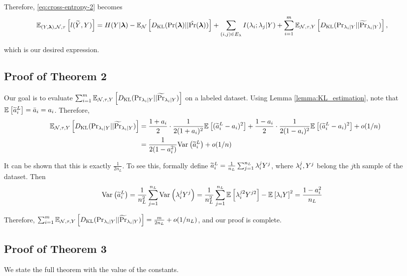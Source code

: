 Therefore, \eqref{eq:cross-entropy-2} becomes
\begin{align}
    \mathbb{E}_{(Y, \bm{\lambda}), \mathcal{N}, \tau}\left[l(\widetilde{Y}, Y)\right] &= H(Y | \bm{\lambda}) - \mathbb{E}_{\mathcal{N}}\left[D_{\mathrm{KL}} (\Pr(\bm{\lambda}) || \hat{\Pr}(\bm{\lambda}))\right] + \sum_{(i, j) \in E_{\lambda}} I(\lambda_i; \lambda_j | Y) + \sum_{i = 1}^m \mathbb{E}_{\mathcal{N}, \tau, Y}\left[D_{\mathrm{KL}} (\mathrm{Pr}_{\lambda_i | Y} || \widetilde{\Pr}_{\lambda_i | Y} )\right], \nonumber 
\end{align}

which is our desired expression.


\subsection{Proof of Theorem 2}

Our goal is to evaluate $\sum_{i = 1}^m \mathbb{E}_{\mathcal{N}, \tau, Y}\left[D_{\mathrm{KL}} (\mathrm{Pr}_{\lambda_i | Y} || \widetilde{\Pr}_{\lambda_i | Y} )\right]$ on a labeled dataset. Using Lemma \ref{lemma:KL_estimation}, note that $\mathbb{E}_{}\left[\widetilde{a}_i^L\right] = \bar{a}_i = a_i$. Therefore,
\begin{align*}
   \mathbb{E}_{\mathcal{N}, \tau, Y}\left[D_{\mathrm{KL}} (\mathrm{Pr}_{\lambda_i | Y} || \widetilde{\Pr}_{\lambda_i | Y} )\right] &= \frac{1 + a_i}{2} \cdot \frac{1}{2(1 + a_i)^2} \mathbb{E}_{}\left[(\widetilde{a}_i^L - a_i)^2\right] + \frac{1 - a_i}{2} \cdot \frac{1}{2(1 - a_i)^2} \mathbb{E}_{}\left[(\widetilde{a}_i^L - a_i)^2\right] + o(1/n) \\
   &=  \frac{1}{2(1 - a_i^2)} \mathrm{Var}_{}\left(\widetilde{a}_i^L\right) + o(1/n)
\end{align*}

It can be shown that this is exactly $\frac{1}{2n_L}$. To see this, formally define $\widetilde{a}_i^L = \frac{1}{n_L} \sum_{j = 1}^{n_L} \lambda_i^j Y^j$, where $\lambda_i^j, Y^j$ belong the $j$th sample of the dataset. Then
\begin{align}
    \mathrm{Var}_{}\left(\widetilde{a}_i^L\right) &= \frac{1}{n_L^2} \sum_{j = 1}^{n_L} \mathrm{Var}_{}\left(\lambda_i^j Y^j\right) = \frac{1}{n_L^2} \sum_{j = 1}^{n_L} \mathbb{E}_{}\left[\lambda_i^{j2} Y^{j2}\right] - \mathbb{E}_{}\left[\lambda_i Y\right]^2 = \frac{1 -a_i^2}{n_L}
\end{align}

Therefore, $\sum_{i = 1}^m \mathbb{E}_{\mathcal{N}, \tau, Y}\left[D_{\mathrm{KL}} (\mathrm{Pr}_{\lambda_i | Y} || \widetilde{\Pr}_{\lambda_i | Y} )\right] = \frac{m}{2n_L} + o(1/n_L)$, and our proof is complete.

\subsection{Proof of Theorem 3} 

We state the full theorem with the value of the constants. 

